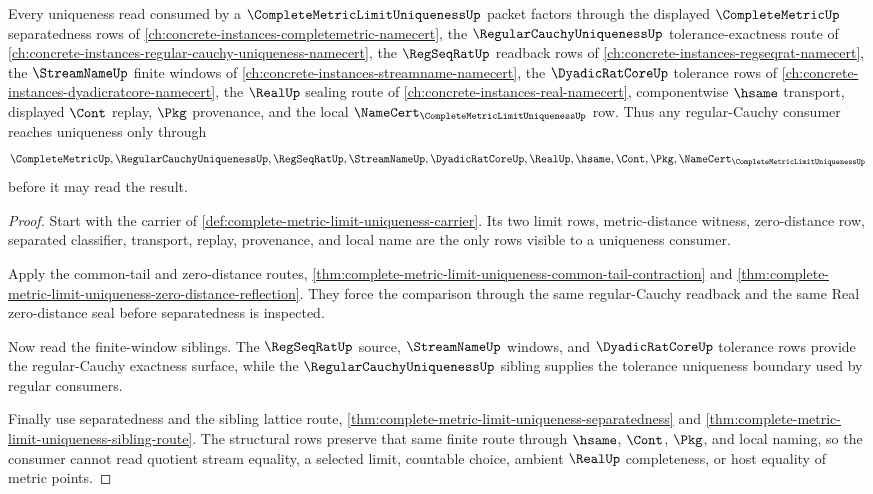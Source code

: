 \begin{theorem}
\label{thm:complete-metric-limit-uniqueness-regular-route}
Every uniqueness read consumed by a $\CompleteMetricLimitUniquenessUp$ packet factors through the displayed $\CompleteMetricUp$ separatedness rows of \autoref{ch:concrete-instances-completemetric-namecert}, the $\RegularCauchyUniquenessUp$ tolerance-exactness route of \autoref{ch:concrete-instances-regular-cauchy-uniqueness-namecert}, the $\RegSeqRatUp$ readback rows of \autoref{ch:concrete-instances-regseqrat-namecert}, the $\StreamNameUp$ finite windows of \autoref{ch:concrete-instances-streamname-namecert}, the $\DyadicRatCoreUp$ tolerance rows of \autoref{ch:concrete-instances-dyadicratcore-namecert}, the $\RealUp$ sealing route of \autoref{ch:concrete-instances-real-namecert}, componentwise $\hsame$ transport, displayed $\Cont$ replay, $\Pkg$ provenance, and the local $\NameCert_{\CompleteMetricLimitUniquenessUp}$ row. Thus any regular-Cauchy consumer reaches uniqueness only through
$$
\CompleteMetricUp,\RegularCauchyUniquenessUp,\RegSeqRatUp,\StreamNameUp,\DyadicRatCoreUp,\RealUp,\hsame,\Cont,\Pkg,\NameCert_{\CompleteMetricLimitUniquenessUp}
$$
before it may read the result.
\end{theorem}
\begin{proof}
Start with the carrier of \autoref{def:complete-metric-limit-uniqueness-carrier}. Its two limit rows, metric-distance witness, zero-distance row, separated classifier, transport, replay, provenance, and local name are the only rows visible to a uniqueness consumer.

Apply the common-tail and zero-distance routes, \autoref{thm:complete-metric-limit-uniqueness-common-tail-contraction} and \autoref{thm:complete-metric-limit-uniqueness-zero-distance-reflection}. They force the comparison through the same regular-Cauchy readback and the same Real zero-distance seal before separatedness is inspected.

Now read the finite-window siblings. The $\RegSeqRatUp$ source, $\StreamNameUp$ windows, and $\DyadicRatCoreUp$ tolerance rows provide the regular-Cauchy exactness surface, while the $\RegularCauchyUniquenessUp$ sibling supplies the tolerance uniqueness boundary used by regular consumers.

Finally use separatedness and the sibling lattice route, \autoref{thm:complete-metric-limit-uniqueness-separatedness} and \autoref{thm:complete-metric-limit-uniqueness-sibling-route}. The structural rows preserve that same finite route through $\hsame$, $\Cont$, $\Pkg$, and local naming, so the consumer cannot read quotient stream equality, a selected limit, countable choice, ambient $\RealUp$ completeness, or host equality of metric points.
\end{proof}
